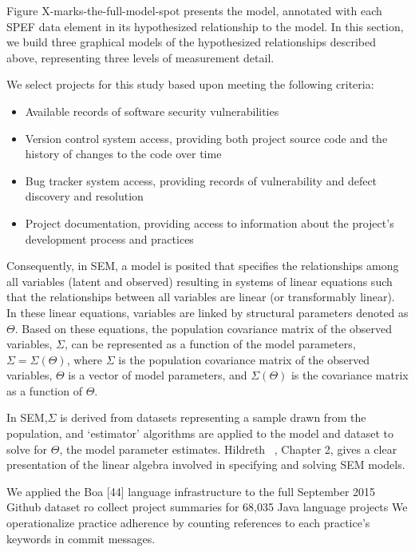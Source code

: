 Figure X-marks-the-full-model-spot presents the model, annotated with each SPEF data element in its hypothesized relationship to the model. 
In this section, we build three graphical models of the hypothesized relationships described above, representing three levels of measurement detail.




We select projects for this study based upon meeting the following criteria:
\begin{itemize}
	
	\item Available records of software security vulnerabilities
	\item Version control system access, providing both project source code and the history of changes to the code over time
	\item Bug tracker system access, providing records of vulnerability and defect discovery and resolution
	\item Project documentation, providing access to information about the project’s development process and practices
\end{itemize}

Consequently, in SEM, a model is posited that specifies the relationships among all variables (latent and observed) resulting in systems of linear equations such that the relationships between all variables are linear (or transformably linear). In these linear equations, variables are linked by structural parameters denoted as $\Theta$. Based on these equations, the population covariance matrix of the observed variables, $\Sigma$, can be represented as a function of the model parameters, $\Sigma=\Sigma(\Theta)$, where $\Sigma$ is the population covariance matrix of the observed variables, $\Theta$ is a vector of model parameters,  and $\Sigma(\Theta)$ is the covariance matrix as a function of $\Theta$. 

In SEM,$\Sigma$ is derived from datasets representing a sample drawn from the population, and `estimator' algorithms are applied to the model and dataset to solve for $\Theta$, the model parameter estimates. Hildreth ~\cite{hildreth2013residual}, Chapter 2, gives a clear presentation of the linear algebra involved in specifying and solving SEM models. 

We applied the Boa [44] language infrastructure to the full September 2015 Github dataset ro collect project summaries for 68,035 Java language projects We operationalize practice adherence by counting references to each practice’s keywords in commit messages. 


